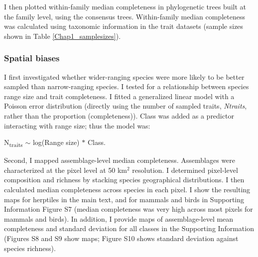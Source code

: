 I then plotted within-family median completeness in phylogenetic trees built at the family level, using the consensus trees. Within-family median completeness was calculated using taxonomic information in the trait datasets (sample sizes shown in Table \ref{Chap1_samplesizes}).

\subsubsection{Spatial biases}

I first investigated whether wider-ranging species were more likely to be better sampled than narrow-ranging species. I tested for a relationship between species range size and trait completeness. I fitted a generalized linear model with a Poisson error distribution (directly using the number of sampled traits, \textit{Ntraits}, rather than the proportion (completeness)). Class was added as a predictor interacting with range size; thus the model was:
\begin{center}
N\textsubscript{traits} $\sim$ log(Range size) $\ast$ Class. 
\end{center}
Second, I mapped assemblage-level median completeness. Assemblages were characterized at the pixel level at 50 km$^2$ resolution. I determined pixel-level composition and richness by stacking species geographical distributions. I then calculated median completeness across species in each pixel. I show the resulting maps for herptiles in the main text, and for mammals and birds in Supporting Information Figure S7 (median completeness was very high across most pixels for mammals and birds). In addition, I provide maps of assemblage-level mean completeness and standard deviation for all classes in the Supporting Information (Figures S8 and S9 show maps; Figure S10 shows standard deviation against species richness).

